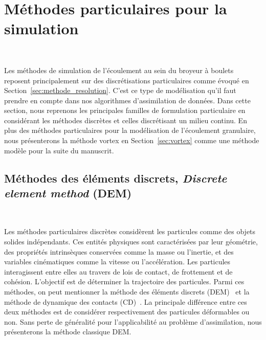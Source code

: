
\section{Méthodes particulaires pour la simulation}~\label{sec:simu_part}

Les méthodes de simulation de l'écoulement au sein du broyeur à boulets reposent principalement sur des discrétisations particulaires comme évoqué en Section~\ref{sec:methode_resolution}. C'est ce type de modélisation qu'il faut prendre en compte dans nos algorithmes d'assimilation de données. Dans cette section, nous reprenons les principales familles de formulation particulaire en considérant les méthodes discrètes et celles discrétisant un milieu continu. En plus des méthodes particulaires pour la modélisation de l'écoulement granulaire, nous présenterons la méthode vortex en Section~\ref{sec:vortex} comme une méthode modèle pour la suite du manuscrit.

\subsection{Méthodes des éléments discrets, \textit{Discrete element method} (DEM)}~\label{sec:part_discret}

Les méthodes particulaires discrètes considèrent les particules comme des objets solides indépendants. Ces entités physiques sont caractérisées par leur géométrie, des propriétés intrinsèques conservées comme la masse ou l'inertie, et des variables cinématiques comme la vitesse ou l'accélération. Les particules interagissent entre elles au travers de lois de contact, de frottement et de cohésion. L'objectif est de déterminer la trajectoire des particules. Parmi ces méthodes, on peut mentionner la méthode des éléments discrets (DEM)~\cite{radjai:hal-00691805} et la méthode de dynamique des contacts (CD)~\cite{moreau:hal-01824750}. La principale différence entre ces deux méthodes est de considérer respectivement des particules déformables ou non. Sans perte de généralité pour l'applicabilité au problème d'assimilation, nous présenterons la méthode classique DEM.

